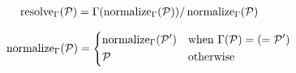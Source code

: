 \documentclass{article}
\theoremstyle{definition}
\newtheorem{theorem}{Theorem}
\begin{document}
\begin{figure}[hbt]
  \vspace{-3mm}
  \caption{Lookup rules -- $\lookup{\E}{\ip} = \iM$}
  \label{module:lookup}

  \begin{subfigure}[t]{0.33\linewidth}
    \begin{align*}
      \operatorname{resolve}_{\Gamma}(\mathcal P)
      &= \Gamma(\operatorname{normalize}_{\Gamma}(\mathcal P))/\operatorname{normalize}_{\Gamma}(\mathcal P)
    \end{align*}
  \end{subfigure}
  \begin{subfigure}[t]{0.33\linewidth}
    \begin{align*}
      \operatorname{normalize}_{\Gamma}(\mathcal P)
      &=
        \begin{dcases}
          \operatorname{normalize}_{\Gamma}(\mathcal P') & \text{when } \Gamma(\mathcal P) = (= \mathcal P') \\
          \mathcal P & \text{otherwise}
        \end{dcases}
    \end{align*}
  \end{subfigure}

\end{figure}





\end{document}
